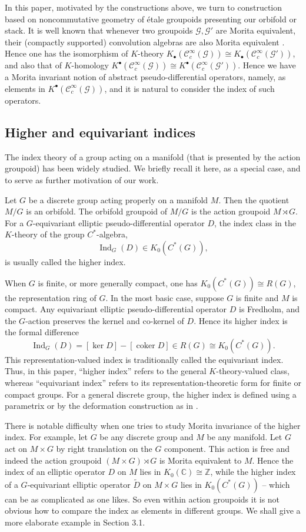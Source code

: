 \documentclass[a4paper]{amsart}
\newcommand{\Ind}{\operatorname{Ind}}
\newcommand{\CC}{\mathbb C}
\newcommand{\ZZ}{\mathbb Z}
\newcommand{\maC}{\mathcal C}
\newcommand{\maG}{\mathcal G}
\newcommand\<{\langle}
\renewcommand\>{\rangle}
\theoremstyle{definition}
\theoremstyle{remark}
\begin{document}
In this paper, motivated by the constructions above,
we turn to construction based on noncommutative geometry of \'etale groupoids presenting our orbifold or stack.
It is well known that whenever two groupoids $\maG, \maG'$ are Morita equivalent,
their (compactly supported) convolution algebras are also Morita equivalent \cite{RenBook80}.
Hence one has the isomorphism of $K$-theory $K _\bullet (\maC^\infty_c (\maG)) \cong K _\bullet (\maC^\infty_c (\maG')) $,
and also that of $K$-homology $K ^\bullet (\maC^\infty_c (\maG)) \cong K ^\bullet (\maC^\infty_c (\maG')) $.
Hence we have a Morita invariant notion of abstract pseudo-differential operators,
namely, as elements in $K ^\bullet (\maC^\infty_c (\maG)) $,
and it is natural to consider the index of such operators.

\subsection{Higher and equivariant indices}
The index theory of a group acting on a manifold (that is presented by the action groupoid) has been widely studied.
We briefly recall it here, as a special case, and to serve as further motivation of our work.

Let $G$ be a discrete group acting properly on a manifold $M$.
Then the quotient $M / G$ is an orbifold. The orbifold groupoid of $M / G$ is the action groupoid $M \rtimes G$.
For a $G$-equivariant elliptic pseudo-differential operator $D$, the index class in the $K$-theory
of the group $C^*$-algebra,
$$\Ind_G(D) \in K _0(C^*(G)),$$
is usually called the higher index.

When $G$ is finite, or more generally compact, one has
$K _0(C^*(G)) \cong R(G)$, the representation ring of $G$.
In the most basic case, suppose $G$ is finite and $M$ is compact.
Any equivariant elliptic pseudo-differential operator $D$ is Fredholm,
and the $G$-action preserves the kernel and co-kernel of $D$.
Hence its higher index is the formal difference
$$\Ind_G(D)=[\ker D]-[\operatorname{coker}D] \in R(G) \cong K _0(C^*(G)).$$
This representation-valued index is traditionally called the equivariant index.
Thus, in this paper, ``higher index'' refers to the general $K$-theory-valued class,
whereas ``equivariant index'' refers to its representation-theoretic form for finite or compact groups.
For a general discrete group, the higher index is defined using a parametrix
or by the deformation construction as in \cite{CRWW23}.

There is notable difficulty when one tries to study Morita invariance of the higher index.
For example, let $G$ be any discrete group and $M$ be any manifold.
Let $G$ act on $M \times G$ by right translation on the $G$ component.
This action is free and indeed the action groupoid $(M \times G) \rtimes G$ is Morita equivalent to $M$.
Hence the index of an elliptic operator $D$ on $M$ lies in $K _0 (\CC) \cong \ZZ$,
while the higher index of a $G$-equivariant elliptic operator $\tilde D$ on $M \times G$
lies in $K _0(C^*(G))$
-- which can be as complicated as one likes.
So even within action groupoids it is not obvious how to compare the index as elements in different groups.
We shall give a more elaborate example in Section 3.1.
\end{document}
